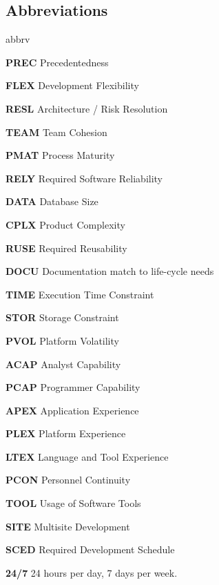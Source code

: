 \subsection{Abbreviations}
	\begin{labeling}{abbrv}
		\item[\textbf{PREC}] Precedentedness
		\item[\textbf{FLEX}] Development Flexibility
		\item[\textbf{RESL}] Architecture / Risk Resolution
		\item[\textbf{TEAM}] Team Cohesion
		\item[\textbf{PMAT}] Process Maturity
	
		\item[\textbf{RELY}] Required Software Reliability
		\item[\textbf{DATA}] Database Size
		\item[\textbf{CPLX}] Product Complexity
		\item[\textbf{RUSE}] Required Reusability
		\item[\textbf{DOCU}] Documentation match to life-cycle needs
		\item[\textbf{TIME}] Execution Time Constraint
		\item[\textbf{STOR}] Storage Constraint
		\item[\textbf{PVOL}] Platform Volatility
		\item[\textbf{ACAP}] Analyst Capability
		\item[\textbf{PCAP}] Programmer Capability
		\item[\textbf{APEX}] Application Experience
		\item[\textbf{PLEX}] Platform Experience
		\item[\textbf{LTEX}] Language and Tool Experience
		\item[\textbf{PCON}] Personnel Continuity
		\item[\textbf{TOOL}] Usage of Software Tools
		\item[\textbf{SITE}] Multisite Development
		\item[\textbf{SCED}] Required Development Schedule
		\item[\textbf{24/7}] 24 hours per day, 7 days per week.
	\end{labeling}